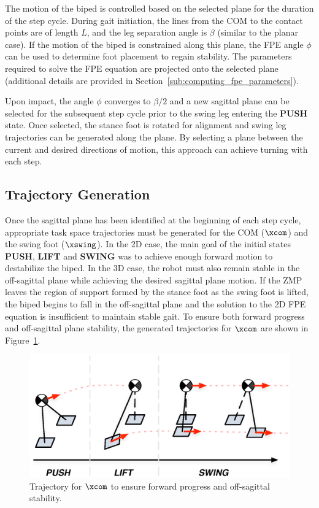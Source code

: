 The motion of the biped is controlled based on the selected plane for the duration of the step cycle. During gait initiation, the lines from the COM to the contact points are of length $L$, and the leg separation angle is $\beta$ (similar to the planar case). If the motion of the biped is constrained along this plane, the FPE angle $\phi$ can be used to determine foot placement to regain stability. The parameters required to solve the FPE equation are projected onto the selected plane (additional details are provided in Section~\ref{sub:computing_fpe_parameters}).

Upon impact, the angle $\phi$ converges to $\beta/2$ and a new sagittal plane can be selected for the subsequent step cycle prior to the swing leg entering the \textbf{PUSH} state. Once selected, the stance foot is rotated for alignment and swing leg trajectories can be generated along the plane. By selecting a plane between the current and desired directions of motion, this approach can achieve turning with each step.


\subsection{Trajectory Generation} %
\label{sub:trajectory_generation}
Once the sagittal plane has been identified at the beginning of each step cycle, appropriate task space trajectories must be generated for the COM ($\xcom$) and the swing foot ($\xswing$). In the 2D case, the main goal of the initial states \textbf{PUSH}, \textbf{LIFT} and \textbf{SWING} was to achieve enough forward motion to destabilize the biped. In the 3D case, the robot must also remain stable in the off-sagittal plane while achieving the desired sagittal plane motion. If the ZMP leaves the region of support formed by the stance foot as the swing foot is lifted, the biped begins to fall in the off-sagittal plane and the solution to the 2D FPE equation is insufficient to maintain stable gait. To ensure both forward progress and off-sagittal plane stability, the generated trajectories for $\xcom$ are shown in Figure~\ref{fig:comtraj3d}. \\

\begin{figure}[!b]
	\centering
    \includegraphics[scale=0.8]{fig/fpe/comtraj3d.eps} 
  	\caption{Trajectory for $\xcom$ to ensure forward progress and off-sagittal stability.}
	\label{fig:comtraj3d}
\end{figure}

